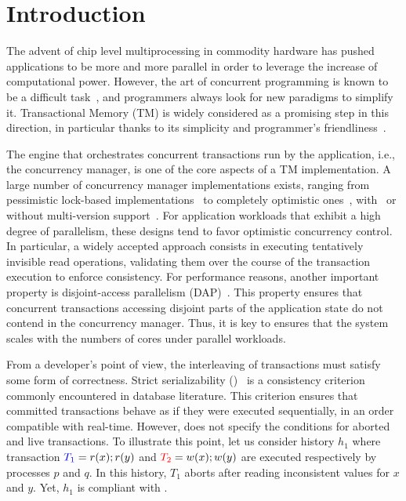 \section{Introduction}

The advent of chip level multiprocessing in commodity hardware has pushed applications to be more and more parallel in order to leverage the increase of computational power.
However, the art of concurrent programming is known to be a difficult task~\cite{Lee:2006:PT:1137232.1137289}, and programmers always look for new paradigms to simplify it.
Transactional Memory (TM) is widely considered as a promising step in this direction, in particular thanks to its simplicity and programmer's friendliness~\cite{Dragojevic:2011:WSM:1924421.1924440}.

The engine that orchestrates concurrent transactions run by the application, i.e., the concurrency manager, is one of the core aspects of a TM implementation.
A large number of concurrency manager implementations exists, ranging from pessimistic lock-based implementations~\cite{harris2005revocable,afek2012pessimistic} to completely optimistic ones~\cite{hassan2014optimistic}, with~\cite{perelman2011smv} or without multi-version support~\cite{attiya2012single}.
For application workloads that exhibit a high degree of parallelism, these designs tend to favor optimistic concurrency control.
In particular, a widely accepted approach consists in executing tentatively invisible read operations, validating them over the course of the transaction execution to enforce consistency.
For performance reasons, another important property is disjoint-access parallelism (DAP)~\cite{ellen2012universal}.
This property ensures that concurrent transactions accessing disjoint parts of the application state do not contend in the concurrency manager.
Thus, it is key to ensures that the system scales with the numbers of cores under parallel workloads.

From a developer's point of view, the interleaving of transactions must satisfy some form of correctness.
Strict serializability (\SSER)~\cite{herlihy1990linearizability} is a consistency criterion commonly encountered in database literature.
This criterion ensures that committed transactions behave as if they were executed sequentially, in an order compatible with real-time.
However, \SSER does not specify the conditions for aborted and live transactions.
To illustrate this point, let us consider history $h_1$ where transaction ${\color{blue}{T_1}}=r(x);r(y)$ and ${\color{red}{T_2}}=w(x);w(y)$ are executed respectively by processes $p$ and $q$.
In this history, $T_1$ aborts after reading inconsistent values for $x$ and $y$.
Yet, $h_1$ is compliant with \SSER.


